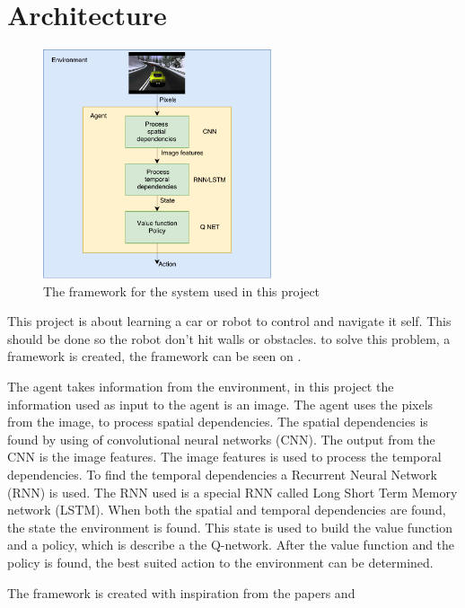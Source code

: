 \chapter{Architecture}
\label{chap:projectdef}



\begin{figure}
	\centering
	\includegraphics[width=0.6\textwidth]{Figures/Architecture/Project_framework_diagram}
	\caption{The framework for the system used in this project}
	\label{fig:Project_framework}
\end{figure}
This project is about learning a car or robot to control and navigate it self. This should be done so the robot don't hit walls or obstacles. to solve this problem, a framework is created, the framework can be seen on .

The agent takes information from the environment, in this project the information used as input to the agent is an image. The agent uses the pixels from the image, to process spatial dependencies. The spatial dependencies is found by using of convolutional neural networks (CNN). The output from the CNN is the image features. The image features is used to process the temporal dependencies. To find the temporal dependencies a Recurrent Neural Network (RNN) is used. The RNN used is a special RNN called Long Short Term Memory network (LSTM). When both the spatial and temporal dependencies are found, the state the environment is found. This state is used to build the value function and a policy, which is describe a the Q-network. After the value function and the policy is found, the best suited action to the environment can be determined.


The framework is created with inspiration from the papers  \cite{DBLP:journals/corr/MnihBMGLHSK16} and \cite{Sallab:2017:2470-1173:70}
\newline







